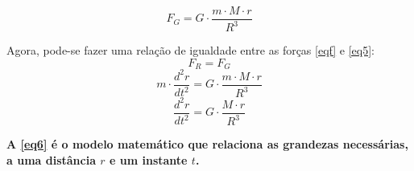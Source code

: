 \documentclass[
	article,			%
	11pt,				%
	oneside,			%
	a4paper,			%
	english,			%
	brazil,				%
	sumario=tradicional
	]{abntex2}
\begin{document}
\begin{equation}\label{eq5}
F_{G} = G \cdot \frac{m \cdot M \cdot r}{R^{3}}
\end{equation}

\noindent Agora, pode-se fazer uma relação de igualdade entre as forças \eqref{eqf} e \eqref{eq5}:
\begin{equation*}
F_{R} = F_{G}
\end{equation*}
\begin{equation*}
m \cdot \frac{d^{2}r}{dt^{2}} = G \cdot \frac{m \cdot M \cdot r}{R^{3}}
\end{equation*}
\begin{equation}\label{eq6}
\frac{d^{2}r}{dt^{2}} = G \cdot \frac{M \cdot r}{R^{3}}
\end{equation}

\textbf{A \autoref{eq6} é o modelo matemático que relaciona as grandezas necessárias, a uma distância $r$ e um instante $t$.}
\end{document}
